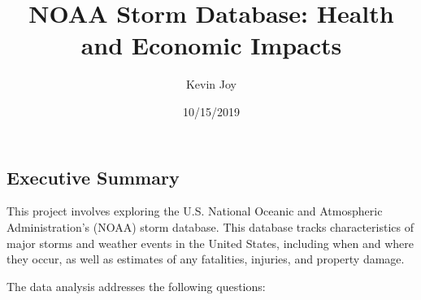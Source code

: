 \documentclass[]{article}
\title{NOAA Storm Database: Health and Economic Impacts}
\author{Kevin Joy}
\date{10/15/2019}
\begin{document}
\maketitle

\hypertarget{executive-summary}{%
\subsection{Executive Summary}\label{executive-summary}}

This project involves exploring the U.S. National Oceanic and
Atmospheric Administration's (NOAA) storm database. This database tracks
characteristics of major storms and weather events in the United States,
including when and where they occur, as well as estimates of any
fatalities, injuries, and property damage.

The data analysis addresses the following questions:
\end{document}
